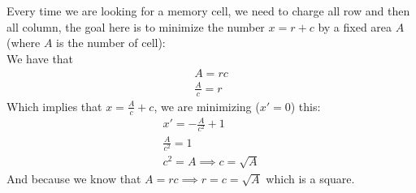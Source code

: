 \begin{framedremark}

Every time we are looking for a memory cell, we need to charge all row and then all column, the goal here is to minimize the number $x =r + c$ by a fixed area $A$ (where $A$ is the number of cell):\\
We have that
\begin{align*} A = rc \\
				\frac{A}{c} = r
\end{align*}
Which implies that $x = \frac{A}{c} + c$, we are minimizing  ($x' = 0$) this:
\begin{align*} 
	x' = -\frac{A}{c^2} + 1 \\
	\frac{A}{c^2} = 1 \\
	c^2 =  A \implies c = \sqrt{A}
\end{align*}
And because we know that $A =  rc \implies r =  c =  \sqrt{A}$ which is a square.

\end{framedremark}
